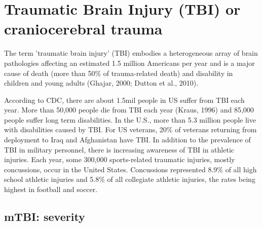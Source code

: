 \section{Traumatic Brain Injury (TBI) or craniocerebral trauma}
\label{sec:TBI}
\label{sec:Traumatic-Brain-Injury}

The term 'traumatic brain injury' (TBI) embodies a heterogeneous array of brain
pathologies affecting an estimated 1.5 million Americans per year and is a major
cause of death (more than 50\% of trauma-related death) and disability in
children and young adults (Ghajar, 2000; Dutton et al., 2010).

According to CDC, there are about 1.5mil people in US suffer from TBI each year.
More than 50,000 people die from TBI each year (Kraus, 1996) and 85,000 people
suffer long term disabilities. 
In the U.S., more than 5.3 million people live with disabilities caused by TBI.
For US veterans, 20\% of veterans returning from deployment to Iraq and
Afghanistan have TBI. In addition to the prevalence of TBI in military
personnel, there is increasing awareness of TBI in athletic injuries.
Each year, some 300,000 sports-related traumatic injuries, mostly concussions,
occur in the United States.
Concussions represented 8.9\% of all high school athletic injuries and 5.8\% of
all collegiate athletic injuries, the rates being highest in football and
soccer.

\subsection{mTBI: severity}
\label{sec:mTBI}

